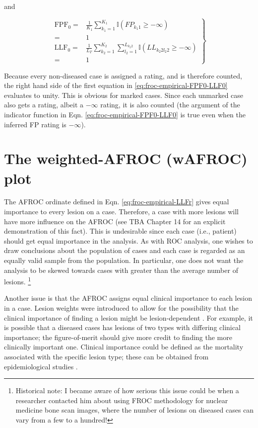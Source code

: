 \documentclass[
]{book}
\begin{document}
and

\begin{equation}
\left.
\begin{aligned} 
\text{FPF}_0 =& \frac{1}{K_1} \sum_{k_1=1}^{K_1} \mathbb{I} \left ( FP_{k_1 1} \geq -\infty \right )\\
=& 1\\
\text{LLF}_0 =& \frac{1}{L_T} \sum_{k_2=1}^{K_2} \sum_{l_2=1}^{L_{k_2 2}}\mathbb{I} \left ( LL_{k_2 2 l_2 2} \geq -\infty \right )\\
=& 1
\end{aligned}
\right \}
\label{eq:froc-empirical-FPF0-LLF0}
\end{equation}

Because every non-diseased case is assigned a rating, and is therefore counted, the right hand side of the first equation in \eqref{eq:froc-empirical-FPF0-LLF0} evaluates to unity. This is obvious for marked cases. Since each unmarked case also gets a rating, albeit a \(-\infty\) rating, it is also counted (the argument of the indicator function in Eqn. \eqref{eq:froc-empirical-FPF0-LLF0} is true even when the inferred FP rating is \(-\infty\)).

\hypertarget{froc-empirical-wAFROC}{%
\section{The weighted-AFROC (wAFROC) plot}\label{froc-empirical-wAFROC}}

The AFROC ordinate defined in Eqn. \eqref{eq:froc-empirical-LLFr} gives equal importance to every lesion on a case. Therefore, a case with more lesions will have more influence on the AFROC (see TBA Chapter 14 for an explicit demonstration of this fact). This is undesirable since each case (i.e., patient) should get equal importance in the analysis. As with ROC analysis, one wishes to draw conclusions about the population of cases and each case is regarded as an equally valid sample from the population. In particular, one does not want the analysis to be skewed towards cases with greater than the average number of lesions. \footnote{Historical note: I became aware of how serious this issue could be when a researcher contacted him about using FROC methodology for nuclear medicine bone scan images, where the number of lesions on diseased cases can vary from a few to a hundred!}

Another issue is that the AFROC assigns equal clinical importance to each lesion in a case. Lesion weights were introduced \citep{RN1385} to allow for the possibility that the clinical importance of finding a lesion might be lesion-dependent \citep{RN1966}. For example, it is possible that a diseased cases has lesions of two types with differing clinical importance; the figure-of-merit should give more credit to finding the more clinically important one. Clinical importance could be defined as the mortality associated with the specific lesion type; these can be obtained from epidemiological studies \citep{desantis2011breast}.
\end{document}
